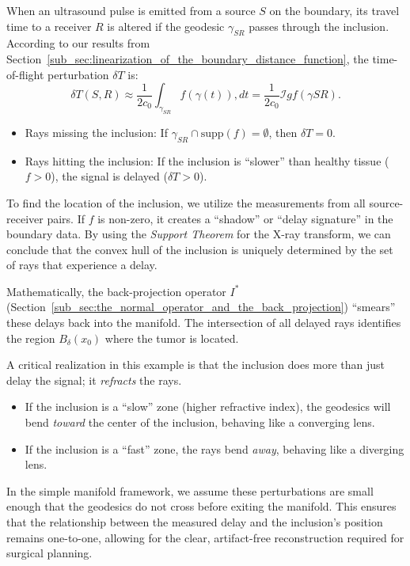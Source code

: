When an ultrasound pulse is emitted from a source $S$ on the boundary, its travel time to a receiver $R$ is altered if the geodesic $\gamma_{SR}$ passes through the inclusion. According to our results from Section~\ref{sub_sec:linearization_of_the_boundary_distance_function}, the time-of-flight perturbation $\delta T$ is:
\[%
  \delta T(S, R) \approx \frac{1}{2c_0} \int_{\gamma_{SR}} f(\gamma(t)) , dt = \frac{1}{2c_0} \mathcal{I}g f(\gamma{SR})
.\]%

\begin{itemize}
  \item Rays missing the inclusion: If $\gamma_{SR} \cap \text{supp}(f) = \emptyset$, then $\delta T = 0$.
  \item Rays hitting the inclusion: If the inclusion is ``slower'' than healthy tissue ($f > 0$), the signal is delayed ($\delta T > 0$).
\end{itemize}

To find the location of the inclusion, we utilize the measurements from all source-receiver pairs. If $f$ is non-zero, it creates a ``shadow'' or ``delay signature'' in the boundary data. By using the \emph{Support Theorem} for the X-ray transform, we can conclude that the convex hull of the inclusion is uniquely determined by the set of rays that experience a delay.

Mathematically, the back-projection operator $I^*$ (Section~\ref{sub_sec:the_normal_operator_and_the_back_projection}) ``smears'' these delays back into the manifold. The intersection of all delayed rays identifies the region $B_\delta(x_0)$ where the tumor is located.

A critical realization in this example is that the inclusion does more than just delay the signal; it \emph{refracts} the rays.
\begin{itemize}
  \item If the inclusion is a ``slow'' zone (higher refractive index), the geodesics will bend \emph{toward} the center of the inclusion, behaving like a converging lens.
  \item If the inclusion is a ``fast'' zone, the rays bend \emph{away}, behaving like a diverging lens.
\end{itemize}

In the simple manifold framework, we assume these perturbations are small enough that the geodesics do not cross before exiting the manifold. This ensures that the relationship between the measured delay and the inclusion's position remains one-to-one, allowing for the clear, artifact-free reconstruction required for surgical planning.

